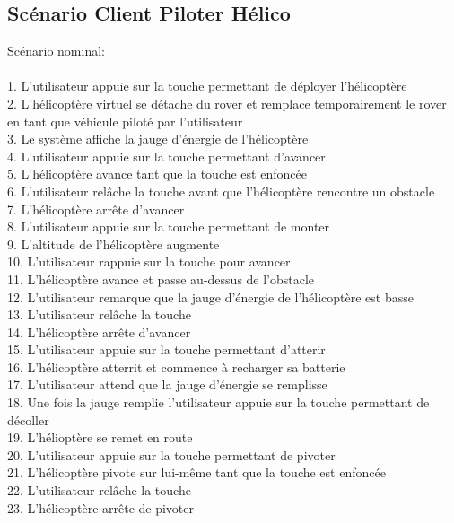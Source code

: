 \documentclass[12pt,a4paper]{scrartcl}
\begin{document}
\subsection{Scénario Client Piloter Hélico}
Scénario nominal:\\
\\
	1. L’utilisateur appuie sur la touche permettant de déployer l’hélicoptère\\
	2. L’hélicoptère virtuel se détache du rover et remplace temporairement le rover en tant que véhicule piloté par l’utilisateur\\
	3. Le système affiche la jauge d’énergie de l’hélicoptère\\
	4. L’utilisateur appuie sur la touche permettant d’avancer\\
	5. L’hélicoptère avance tant que la touche est enfoncée\\
	6. L’utilisateur relâche la touche avant que l’hélicoptère rencontre un obstacle\\
	7. L’hélicoptère arrête d’avancer\\
	8. L’utilisateur appuie sur la touche permettant de monter\\
	9. L’altitude de l’hélicoptère augmente\\
	10. L’utilisateur rappuie sur la touche pour avancer\\
	11. L’hélicoptère avance et passe au-dessus de l’obstacle\\
	12. L’utilisateur remarque que la jauge d’énergie de l’hélicoptère est basse\\
	13. L’utilisateur relâche la touche\\
	14. L’hélicoptère arrête d’avancer\\
	15. L’utilisateur appuie sur la touche permettant d’atterir\\
	16. L’hélicoptère atterrit et commence à recharger sa batterie\\
	17. L’utilisateur attend que la jauge d’énergie se remplisse\\
	18. Une fois la jauge remplie l’utilisateur appuie sur la touche permettant de décoller\\
	19. L’hélioptère se remet en route\\
	20. L’utilisateur appuie sur la touche permettant de pivoter\\
	21. L’hélicoptère pivote sur lui-même tant que la touche est enfoncée\\
	22. L’utilisateur relâche la touche\\
	23. L’hélicoptère arrête de pivoter\\
\end{document}
